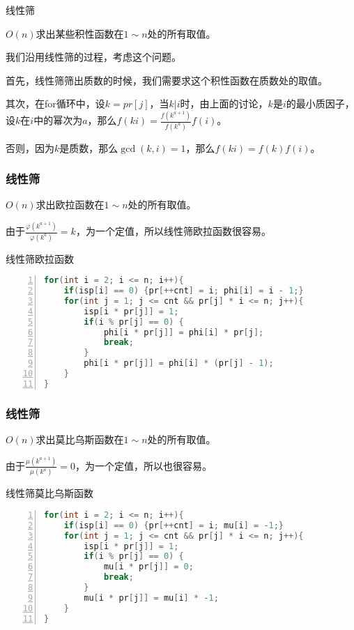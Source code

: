 \documentclass{ctexbeamer}        %
\begin{document}
\begin{frame}{线性筛}
\begin{example}[线性筛]
    $O(n)$求出某些积性函数在$1 \sim n$处的所有取值。
\end{example}
我们沿用线性筛的过程，考虑这个问题。

首先，线性筛筛出质数的时候，我们需要求这个积性函数在质数处的取值。

其次，在for循环中，设$k=pr[j]$，当$k|i$时，由上面的讨论，$k$是$i$的最小质因子，设$k$在$i$中的幂次为$a$，那么$f(ki)=\frac{f(k^{a+1})}{f(k^a)}f(i)$。

否则，因为$k$是质数，那么$\gcd(k,i)=1$，那么$f(ki)=f(k)f(i)$。
\end{frame}

\begin{frame}[fragile]
\frametitle{线性筛}
\begin{example}[线性筛欧拉函数]
    $O(n)$求出欧拉函数在$1 \sim n$处的所有取值。
\end{example}
由于$\frac{\varphi(k^{a+1})}{\varphi(k^a)}=k$，为一个定值，所以线性筛欧拉函数很容易。
\begin{block}{线性筛欧拉函数}
\begin{lstlisting}[language={c++},
                   numbers=left]
for(int i = 2; i <= n; i++){
    if(isp[i] == 0) {pr[++cnt] = i; phi[i] = i - 1;}
    for(int j = 1; j <= cnt && pr[j] * i <= n; j++){  
        isp[i * pr[j]] = 1;  
        if(i % pr[j] == 0) {
            phi[i * pr[j]] = phi[i] * pr[j];
            break;
        }
        phi[i * pr[j]] = phi[i] * (pr[j] - 1);
    }  
}
\end{lstlisting}
\end{block}
\end{frame}

\begin{frame}[fragile]
\frametitle{线性筛}
\begin{example}[线性筛莫比乌斯函数]
    $O(n)$求出莫比乌斯函数在$1 \sim n$处的所有取值。
\end{example}
由于$\frac{\mu(k^{a+1})}{\mu(k^a)}=0$，为一个定值，所以也很容易。
\begin{block}{线性筛莫比乌斯函数}
\begin{lstlisting}[language={c++},
                   numbers=left]
for(int i = 2; i <= n; i++){
    if(isp[i] == 0) {pr[++cnt] = i; mu[i] = -1;}
    for(int j = 1; j <= cnt && pr[j] * i <= n; j++){  
        isp[i * pr[j]] = 1;  
        if(i % pr[j] == 0) {
            mu[i * pr[j]] = 0;
            break;
        }
        mu[i * pr[j]] = mu[i] * -1;
    }  
}
\end{lstlisting}
\end{block}
\end{frame}
\end{document}
